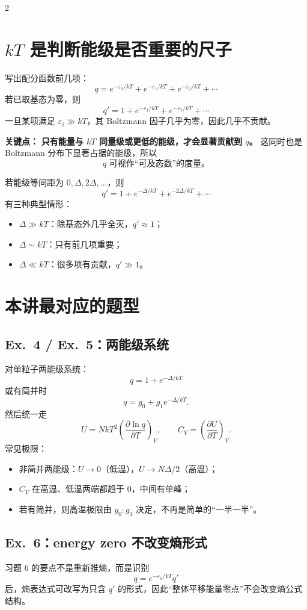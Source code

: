 \documentclass[a4paper,9pt]{article}
\newenvironment{keypoint}
{\par\vspace{0.3em}\noindent\begin{tcolorbox}[
  colback=keybg,
  colframe=keycolor,
  boxrule=0.5pt,
  arc=2pt,
  left=2pt,
  right=2pt,
  top=2pt,
  bottom=2pt,
  boxsep=0pt,
  ]
\noindent\textcolor{keycolor}{\textbf{关键点：}}}
{\end{tcolorbox}\par\vspace{0.3em}}
\begin{document}
\begin{multicols}{2}
	\section{$kT$ 是判断能级是否重要的尺子}

	写出配分函数前几项：
	\[
		q=e^{-\varepsilon_0/kT}+e^{-\varepsilon_1/kT}+e^{-\varepsilon_2/kT}+\cdots
	\]
	若已取基态为零，则
	\[
		q'=1+e^{-\varepsilon_1/kT}+e^{-\varepsilon_2/kT}+\cdots
	\]
	一旦某项满足 $\varepsilon_i\gg kT$，其 Boltzmann 因子几乎为零，因此几乎不贡献。

	\begin{keypoint}
		\textbf{只有能量与 $kT$ 同量级或更低的能级，才会显著贡献到 $q$。}
		这同时也是 Boltzmann 分布下显著占据的能级，所以
		\[
			q \text{ 可视作“可及态数”的度量。}
		\]
	\end{keypoint}

	若能级等间距为 $0,\Delta,2\Delta,\dots$，则
	\[
		q'=1+e^{-\Delta/kT}+e^{-2\Delta/kT}+\cdots
	\]
	有三种典型情形：
	\begin{itemize}
		\item $\Delta\gg kT$：除基态外几乎全灭，$q'\approx1$；
		\item $\Delta\sim kT$：只有前几项重要；
		\item $\Delta\ll kT$：很多项有贡献，$q'\gg1$。
	\end{itemize}

	\section{本讲最对应的题型}

	\subsection{Ex.~4 / Ex.~5：两能级系统}
	对单粒子两能级系统：
	\[
		q=1+e^{-\Delta/kT}
	\]
	或有简并时
	\[
		q=g_0+g_1e^{-\Delta/kT}.
	\]
	然后统一走
	\[
		U=NkT^2\left(\frac{\partial\ln q}{\partial T}\right)_V,
		\qquad
		C_V=\left(\frac{\partial U}{\partial T}\right)_V.
	\]
	常见极限：
	\begin{itemize}
		\item 非简并两能级：$U\to 0$（低温），$U\to N\Delta/2$（高温）；
		\item $C_V$ 在高温、低温两端都趋于 0，中间有单峰；
		\item 若有简并，则高温极限由 $g_0:g_1$ 决定，不再是简单的“一半一半”。
	\end{itemize}

	\subsection{Ex.~6：energy zero 不改变熵形式}
	习题 6 的要点不是重新推熵，而是识别
	\[
		q=e^{-\varepsilon_0/kT}q'
	\]
	后，熵表达式可改写为只含 $q'$ 的形式，因此“整体平移能量零点”不会改变熵公式结构。


\end{multicols}
\end{document}
